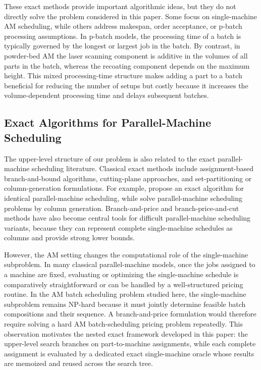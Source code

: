\documentclass[review,3p,times,authoryear]{elsarticle}
\begin{document}
These exact methods provide important algorithmic ideas, but they do not
directly solve the problem considered in this paper. Some focus on
single-machine AM scheduling, while others address makespan, order acceptance,
or p-batch processing assumptions. In p-batch models, the processing time of a
batch is typically governed by the longest or largest job in the batch. By
contrast, in powder-bed AM the laser scanning component is additive in the
volumes of all parts in the batch, whereas the recoating component depends on
the maximum height. This mixed processing-time structure makes adding a part to
a batch beneficial for reducing the number of setups but costly because it
increases the volume-dependent processing time and delays subsequent batches.

\subsection{Exact Algorithms for Parallel-Machine Scheduling}

The upper-level structure of our problem is also related to the exact
parallel-machine scheduling literature. Classical exact methods include
assignment-based branch-and-bound algorithms, cutting-plane approaches, and
set-partitioning or column-generation formulations. For example,
\citet{mokotoffExactAlgorithmIdentical2004} propose an exact algorithm for
identical parallel-machine scheduling, while \citet{chenSolvingParallelMachine1999}
solve parallel-machine scheduling problems by column generation. Branch-and-price
and branch-price-and-cut methods have also become central tools for difficult
parallel-machine scheduling variants, because they can represent complete
single-machine schedules as columns and provide strong lower bounds.

However, the AM setting changes the computational role of the single-machine
subproblem. In many classical parallel-machine models, once the jobs assigned
to a machine are fixed, evaluating or optimizing the single-machine schedule is
comparatively straightforward or can be handled by a well-structured pricing
routine. In the AM batch scheduling problem studied here, the single-machine
subproblem remains NP-hard because it must jointly determine feasible batch
compositions and their sequence. A branch-and-price formulation would therefore
require solving a hard AM batch-scheduling pricing problem repeatedly. This
observation motivates the nested exact framework developed in this paper:
the upper-level search branches on part-to-machine assignments, while each
complete assignment is evaluated by a dedicated exact single-machine oracle
whose results are memoized and reused across the search tree.
\end{document}
